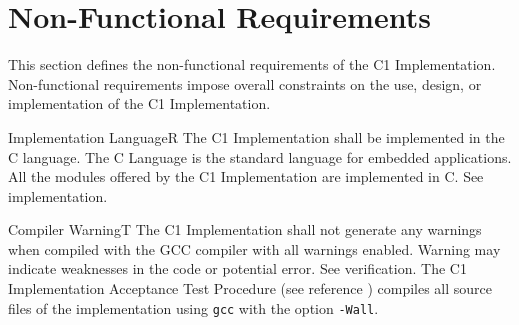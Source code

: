 \documentclass[a4paper,10pt]{article}
\let\stdsection\section
\renewcommand\section{\newpage\stdsection}
\newenvironment{fw_req}[6]
{\addtocounter{subsubsection}{1}
	\hspace{0.2cm}\textbf{FW-\arabic{section}.\arabic{subsection}.\arabic{subsubsection}/#2
	\hspace{0.8cm} #1}
	\vspace{-10pt}
\begin{longtable}{p{2.7cm}P{8.5cm}}
\hline
\textsc{Requirement} & #3 \\
\textsc{Justification} & #4 \\
\textsc{Implementation} & #5  \\ 
\textsc{Verification} & #6  \\
\hline
}
{\end{longtable}}
\begin{document}
\section{Non-Functional Requirements}

This section defines the non-functional requirements of the C1 Implementation. Non-functional requirements impose overall constraints on the use, 
design, or implementation of the C1 Implementation.

\label{req:codingReqs}

\begin{fw_req}{Implementation Language}{R}
{The C1 Implementation shall be implemented in the C language.}
{The C Language is the standard language for embedded applications.}
{All the modules offered by the C1 Implementation are implemented in C.} 
{See implementation.}
\end{fw_req}


\begin{fw_req}{Compiler Warning}{T}
{The C1 Implementation shall not generate any warnings when compiled with the GCC compiler with all warnings enabled.}
{Warning may indicate weaknesses in the code or potential error.}
{See verification.} 
{The C1 Implementation Acceptance Test Procedure (see reference \cite{ref:um}) compiles all source files of the implementation using \texttt{gcc} with the option \texttt{-Wall}.}
\end{fw_req}
\end{document}
